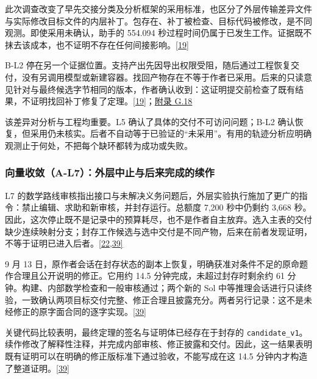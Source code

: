 此次调查改变了早先交接分类及分析框架的采用标准，也区分了外层传输差异文件与实际修改目标文件的内层补丁。包存在、补丁被检查、目标代码被修改，是不同观测。即使采用未确认，助手的 554.094 秒过程时间仍属于已发生工作。证据既不抹去该成本，也不证明不存在任何间接影响。\href{zh.pdf\#ref-19}{\mbox{[19]}}

B-L2 停在另一个证据位置。支持产出先因导出权限受阻，随后通过工程恢复交付，没有另调用模型或新建容器。找回产物存在不等于作者已采用。后来的只读意见针对与最终候选字节相同的版本，作者确认收到：这证明提交前检查了既有结果，不证明找回补丁修复了定理。\href{zh.pdf\#ref-19}{\mbox{[19]}}；\href{zh-appendix.pdf\#g18}{附录 G.18}

该差异对分析与工程均重要。L5 确认了具体的交付不可访问问题；B-L2 确认恢复，但采用仍未核实。后者不自动等于已验证的“未采用”。有用的轨迹分析应明确观测止于何处，不把每个缺环都转为成功或失败。

\subsubsection[向量收敛（A-L7）：外层中止与后来完成的续作]{\texorpdfstring{\protect\hypertarget{r2-6}{}向量收敛（A-L7）：外层中止与后来完成的续作}{向量收敛（A-L7）：外层中止与后来完成的续作}}
L7 的数学路线审核指出接口与未解决义务问题后，外层实验执行施加了更广的指令：禁止编辑、求助和新审核，并封存运行。总额度 7,200 秒中仍剩约 3,668 秒。因此，这次停止既不是记录中的预算耗尽，也不是作者自主放弃。选入主表的交付缺少连续映射分支；封存工作候选与选中交付是不同产物，后来在前者发现证明，不等于证明已进入后者。\href{zh.pdf\#ref-22}{\mbox{[22,39]}}

9 月 13 日，原作者会话在封存状态的副本上恢复，明确获准对条件不足的原命题作合理且公开说明的修正。它用约 14.5 分钟完成，未超过封存时剩余约 61 分钟。构建、内部数学检查和一般审核通过；两个新的 Sol 中等推理会话进行只读终验，一致确认两项目标交付完整、修正合理且披露充分。两者另行记录：这不是未经修正的原字面合同的逐字实现。\href{zh.pdf\#ref-39}{\mbox{[39]}}

关键代码比较表明，最终定理的签名与证明体已经存在于封存的 \nolinkurl{candidate_v1}。续作修改了解释性注释，并完成内部审核、修正披露和交付。因此，这一结果表明既有证明可以在明确的修正版标准下通过验收，不能写成在这 14.5 分钟内才构造了整道证明。\href{zh.pdf\#ref-39}{\mbox{[39]}}

